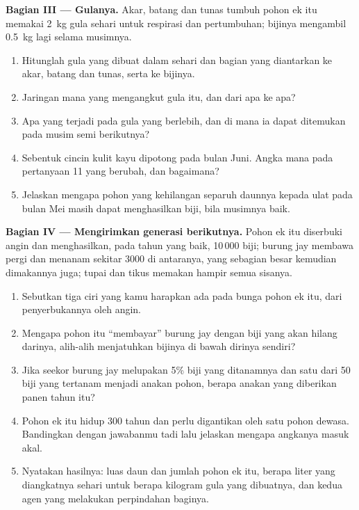 \begin{problem}
\medskip
\noindent\textbf{Bagian III --- Gulanya.}
Akar, batang dan tunas tumbuh pohon ek itu memakai \qty{2}{kg} gula
sehari untuk respirasi dan pertumbuhan; bijinya mengambil
\qty{0.5}{kg} lagi selama musimnya.
\begin{enumerate}[resume]
  \item Hitunglah gula yang dibuat dalam sehari dan bagian yang
        diantarkan ke akar, batang dan tunas, serta ke bijinya.
  \item Jaringan mana yang mengangkut gula itu, dan dari apa ke apa?
  \item Apa yang terjadi pada gula yang berlebih, dan di mana ia dapat
        ditemukan pada musim semi berikutnya?
  \item Sebentuk cincin kulit kayu dipotong pada bulan Juni. Angka mana
        pada pertanyaan 11 yang berubah, dan bagaimana?
  \item Jelaskan mengapa pohon yang kehilangan separuh daunnya kepada
        ulat pada bulan Mei masih dapat menghasilkan biji, bila
        musimnya baik.
\end{enumerate}

\medskip
\noindent\textbf{Bagian IV --- Mengirimkan generasi berikutnya.}
Pohon ek itu diserbuki angin dan menghasilkan, pada tahun yang baik,
10\,000 biji; burung jay membawa pergi dan menanam sekitar 3000 di
antaranya, yang sebagian besar kemudian dimakannya juga; tupai dan
tikus memakan hampir semua sisanya.
\begin{enumerate}[resume]
  \item Sebutkan tiga ciri yang kamu harapkan ada pada bunga pohon ek
        itu, dari penyerbukannya oleh angin.
  \item Mengapa pohon itu ``membayar'' burung jay dengan biji yang akan
        hilang darinya, alih-alih menjatuhkan bijinya di bawah dirinya
        sendiri?
  \item Jika seekor burung jay melupakan 5\% biji yang ditanamnya dan
        satu dari 50 biji yang tertanam menjadi anakan pohon, berapa
        anakan yang diberikan panen tahun itu?
  \item Pohon ek itu hidup 300 tahun dan perlu digantikan oleh satu
        pohon dewasa. Bandingkan dengan jawabanmu tadi lalu jelaskan
        mengapa angkanya masuk akal.
  \item Nyatakan hasilnya: luas daun dan jumlah  pohon ek itu,
        berapa liter yang diangkatnya sehari untuk berapa kilogram gula
        yang dibuatnya, dan kedua agen yang melakukan perpindahan
        baginya.
\end{enumerate}
\end{problem}
